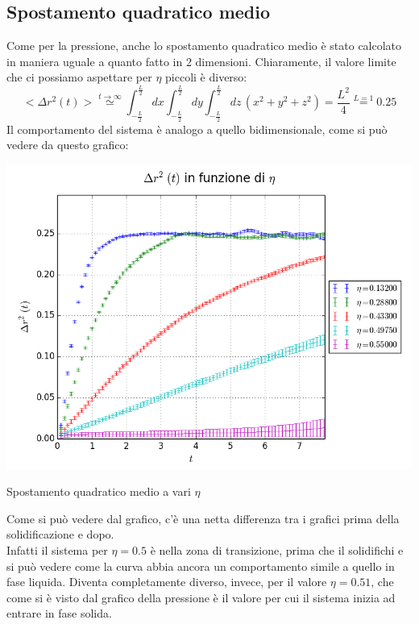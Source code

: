 \subsection{Spostamento quadratico medio}
Come per la pressione, anche lo spostamento quadratico medio è stato calcolato in maniera uguale a quanto fatto in 2 dimensioni. Chiaramente, il valore limite che ci possiamo aspettare per $\eta$ piccoli è diverso:
$$
<\Delta r^2(t)> \overset{\mathit{t\rightarrow \infty}}{\simeq} \int_{-\frac{L}{2}}^{\frac{L}{2}} dx \int_{-\frac{L}{2}}^{\frac{L}{2}}dy \int_{-\frac{L}{2}}^{\frac{L}{2}} dz \, ( x^2 + y^2 +z^2 ) = \frac{L^2}{4} \overset{\mathit{L=1}}{=} 0.25
$$
Il comportamento del sistema è analogo a quello bidimensionale, come si può vedere da questo grafico:

\begin{myfig}[h]
	\includegraphics[scale=0.5]{sfere3D/dr2vari.png}
	\caption{Spostamento quadratico medio a vari $\eta$}
\end{myfig}
Come si può vedere dal grafico, c'è una netta differenza tra i grafici prima della solidificazione e dopo.\\
Infatti il sistema per $\eta=0.5$ è nella zona di transizione, prima che il solidifichi e si può vedere come la curva abbia ancora un comportamento simile a quello in fase liquida.
Diventa completamente diverso, invece, per il valore $\eta=0.51$, che come si è visto dal grafico della pressione è il valore per cui il sistema inizia ad entrare in fase solida.

